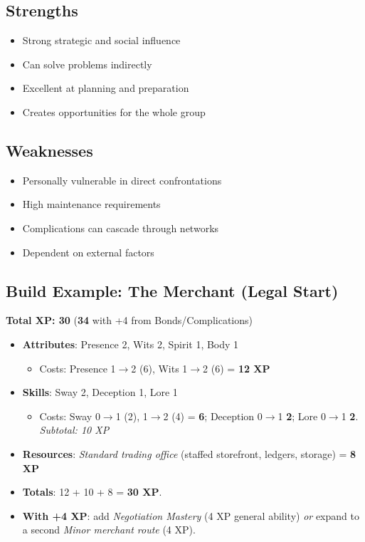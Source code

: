 \subsection*{Strengths}
\begin{itemize}
\item Strong strategic and social influence
\item Can solve problems indirectly
\item Excellent at planning and preparation
\item Creates opportunities for the whole group
\end{itemize}

\subsection*{Weaknesses}
\begin{itemize}
\item Personally vulnerable in direct confrontations
\item High maintenance requirements
\item Complications can cascade through networks
\item Dependent on external factors
\end{itemize}

\subsection*{Build Example: The Merchant (Legal Start)}
\textbf{Total XP: 30} \quad (\textbf{34} with +4 from Bonds/Complications)
\begin{itemize}
\item \textbf{Attributes}: Presence 2, Wits 2, Spirit 1, Body 1
  \begin{itemize}
  \item Costs: Presence 1$\to$2 (6), Wits 1$\to$2 (6) = \textbf{12 XP}
  \end{itemize}
\item \textbf{Skills}: Sway 2, Deception 1, Lore 1
  \begin{itemize}
  \item Costs: Sway 0$\to$1 (2), 1$\to$2 (4) = \textbf{6}; Deception 0$\to$1 \textbf{2}; Lore 0$\to$1 \textbf{2}. \emph{Subtotal: 10 XP}
  \end{itemize}
\item \textbf{Resources}: \emph{Standard trading office} (staffed storefront, ledgers, storage) = \textbf{8 XP}
\item \textbf{Totals}: 12 + 10 + 8 = \textbf{30 XP}.
\item \textbf{With +4 XP}: add \emph{Negotiation Mastery} (4 XP general ability) \emph{or} expand to a second \emph{Minor merchant route} (4 XP).
\end{itemize}

